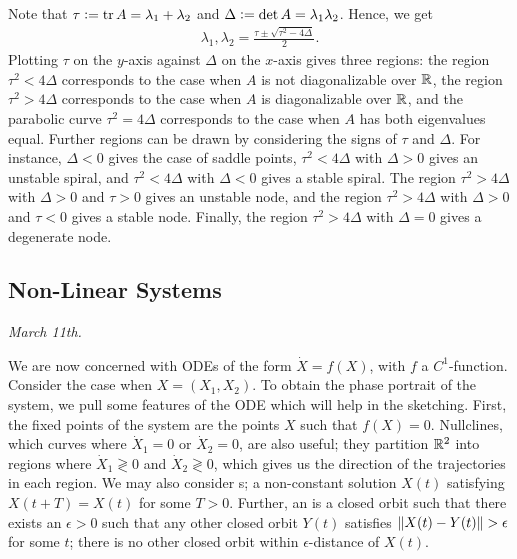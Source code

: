 Note that $\tau \vcentcolon= \operatorname{tr} A = \lambda_{1} + \lambda_{2}$ and $\Delta \vcentcolon= \det A = \lambda_{1} \lambda_{2}$. Hence, we get
\begin{align}
    \lambda_{1},\lambda_{2} = \frac{\tau \pm \sqrt{\tau^{2} - 4\Delta}}{2}.
\end{align}
Plotting $\tau$ on the $y$-axis against $\Delta$ on the $x$-axis gives three regions: the region $\tau^{2} < 4\Delta$ corresponds to the case when $A$ is not diagonalizable over $\mathbb{R}$, the region $\tau^{2} > 4\Delta$ corresponds to the case when $A$ is diagonalizable over $\mathbb{R}$, and the parabolic curve $\tau^{2} = 4\Delta$ corresponds to the case when $A$ has both eigenvalues equal. Further regions can be drawn by considering the signs of $\tau$ and $\Delta$. For instance, $\Delta < 0$ gives the case of saddle points, $\tau^{2} < 4 \Delta$ with $\Delta > 0$ gives an unstable spiral, and $\tau^{2} < 4 \Delta$ with $\Delta < 0$ gives a stable spiral. The region $\tau^{2} > 4 \Delta$ with $\Delta > 0$ and $\tau > 0$ gives an unstable node, and the region $\tau^{2} > 4 \Delta$ with $\Delta > 0$ and $\tau < 0$ gives a stable node. Finally, the region $\tau^{2} > 4 \Delta$ with $\Delta = 0$ gives a degenerate node.

\subsection{Non-Linear Systems}
\noindent \textit{March 11th.}

We are now concerned with ODEs of the form $\dot{X} = f(X)$, with $f$ a $C^{1}$-function. Consider the case when $X = (X_{1},X_{2})$. To obtain the phase portrait of the system, we pull some features of the ODE which will help in the sketching. First, the fixed points of the system are the points $X$ such that $f(X) = 0$. Nullclines, which curves where $\dot{X}_{1} = 0$ or $\dot{X}_{2} = 0$, are also useful; they partition $\mathbb{R}^{2}$ into regions where $\dot{X}_{1} \gtrless 0$ and $\dot{X}_{2} \gtrless 0$, which gives us the direction of the trajectories in each region. We may also consider s; a non-constant solution $X(t)$ satisfying $X(t+T) = X(t)$ for some $T > 0$. Further, an  is a closed orbit such that there exists an $\epsilon > 0$ such that any other closed orbit $Y(t)$ satisfies $\left\lVert X(t) - Y(t)\right\rVert > \epsilon$ for some $t$; there is no other closed orbit within $\epsilon$-distance of $X(t)$.

